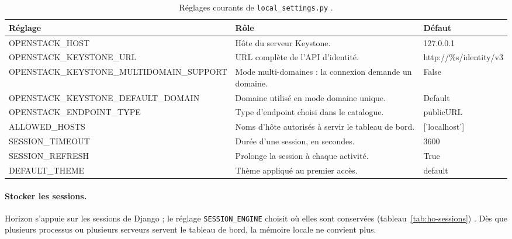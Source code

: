 \begin{table}[!ht]
\centering
\renewcommand{\arraystretch}{1.3}
\begin{tabular}{@{}>{\raggedright\arraybackslash\ttfamily\small}p{5.6cm}>{\raggedright\arraybackslash}p{6.2cm}>{\raggedright\arraybackslash\ttfamily\small}p{3.7cm}@{}}
\toprule
\textrm{\textbf{Réglage}} & \textbf{Rôle} & \textrm{\textbf{Défaut}} \\
\midrule
OPENSTACK\_\allowbreak HOST & Hôte du serveur Keystone. & 127.0.0.1 \\
OPENSTACK\_\allowbreak KEYSTONE\_\allowbreak URL & URL complète de l'API d'identité. & http://\%s/identity/v3 \\
OPENSTACK\_\allowbreak KEYSTONE\_\allowbreak MULTIDOMAIN\_\allowbreak SUPPORT & Mode multi-domaines : la connexion demande un domaine. & False \\
OPENSTACK\_\allowbreak KEYSTONE\_\allowbreak DEFAULT\_\allowbreak DOMAIN & Domaine utilisé en mode domaine unique. & Default \\
OPENSTACK\_\allowbreak ENDPOINT\_\allowbreak TYPE & Type d'endpoint choisi dans le catalogue. & publicURL \\
ALLOWED\_\allowbreak HOSTS & Noms d'hôte autorisés à servir le tableau de bord. & ['localhost'] \\
SESSION\_\allowbreak TIMEOUT & Durée d'une session, en secondes. & 3600 \\
SESSION\_\allowbreak REFRESH & Prolonge la session à chaque activité. & True \\
DEFAULT\_\allowbreak THEME & Thème appliqué au premier accès. & default \\
\bottomrule
\end{tabular}
\caption{Réglages courants de \texttt{local\_\allowbreak settings.py} \parencite{horizon-settings}.}
\label{tab:ho-reglages}
\end{table}

\paragraph{Stocker les sessions.} Horizon s'appuie sur les sessions de Django ; le réglage \texttt{SESSION\_\allowbreak ENGINE} choisit où
elles sont conservées (tableau~\ref{tab:ho-sessions}) \parencite{horizon-sessions}. Dès que plusieurs processus ou plusieurs
serveurs servent le tableau de bord, la mémoire locale ne convient plus.

